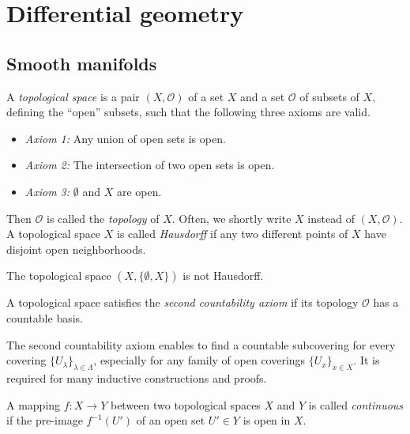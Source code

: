 \chapter{Differential geometry}


\section{Smooth manifolds}

A \emph{topological space} is a pair $(X,\mathscr{O})$ of a set $X$ and a set $\mathscr{O}$ of subsets of $X$, defining the “open” subsets, such that the following three axioms are valid. \cite[7]{Jaenich-1999}
\begin{itemize}
\item
\emph{Axiom 1:}
Any union of open sets is open.

\item
\emph{Axiom 2:}
The intersection of two open sets is open.

\item
\emph{Axiom 3:}
$\emptyset$ and $X$ are open.
\end{itemize}
%
Then $\mathscr{O}$ is called the \emph{topology} of $X$.
Often, we shortly write $X$ instead of $(X,\mathscr{O})$.
A topological space $X$ is called \emph{Hausdorff} if any two different points of $X$ have disjoint open neighborhoods. \cite[22]{Jaenich-1999}

\begin{beispiel}
	The topological space $(X, \{\emptyset, X\})$ is not Hausdorff. \cite[23]{Jaenich-1999}
\end{beispiel}

A topological space satisfies the \emph{second countability axiom} if its topology $\mathscr{O}$ has a countable basis. \cite[98]{Jaenich-1999}

\begin{bem}
	The second countability axiom enables  to find a countable subcovering
	for every covering $\{U_\lambda\}_{\lambda \in \Lambda}$, especially for any family of open coverings $\{U_x\}_{x \in X}$.
	It is required for many inductive constructions and proofs. \cite[106]{Jaenich-1999}
\end{bem}

A mapping $f:X \to Y$ between two topological spaces $X$ and $Y$ is called \emph{continuous} if the pre-image $f^{-1}(U')$ of an open set $U' \in Y$ is open in $X$. \cite[16]{Jaenich-1999} 

